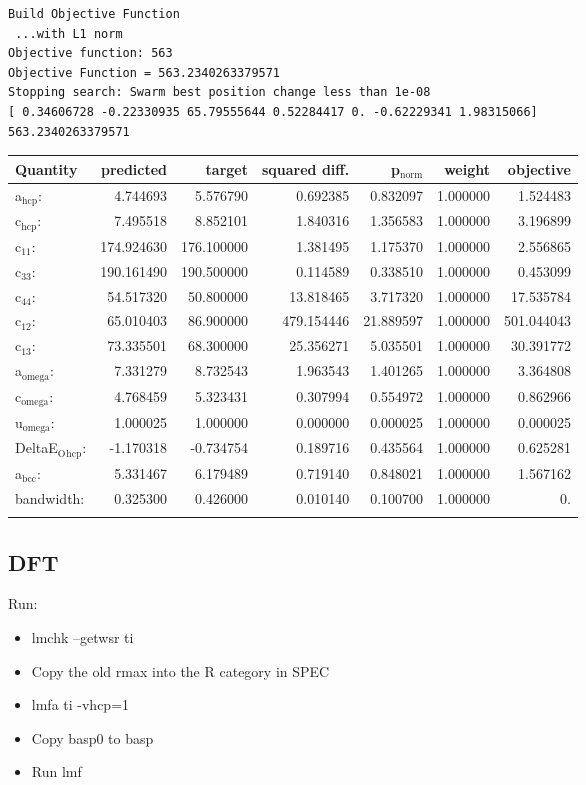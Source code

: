 \documentclass[11pt]{article}
\begin{document}
\begin{verbatim}
Build Objective Function
 ...with L1 norm 
Objective function: 563 
Objective Function = 563.2340263379571 
Stopping search: Swarm best position change less than 1e-08 
[ 0.34606728 -0.22330935 65.79555644 0.52284417 0. -0.62229341 1.98315066] 
563.2340263379571
\end{verbatim}

\begin{center}
\begin{tabular}{lrrrrrr}
Quantity & predicted & target & squared diff. & p\(_{\text{norm}}\) & weight & objective\\
\hline
a\(_{\text{hcp}}\): & 4.744693 & 5.576790 & 0.692385 & 0.832097 & 1.000000 & 1.524483\\
c\(_{\text{hcp}}\): & 7.495518 & 8.852101 & 1.840316 & 1.356583 & 1.000000 & 3.196899\\
c\(_{\text{11}}\): & 174.924630 & 176.100000 & 1.381495 & 1.175370 & 1.000000 & 2.556865\\
c\(_{\text{33}}\): & 190.161490 & 190.500000 & 0.114589 & 0.338510 & 1.000000 & 0.453099\\
c\(_{\text{44}}\): & 54.517320 & 50.800000 & 13.818465 & 3.717320 & 1.000000 & 17.535784\\
c\(_{\text{12}}\): & 65.010403 & 86.900000 & 479.154446 & 21.889597 & 1.000000 & 501.044043\\
c\(_{\text{13}}\): & 73.335501 & 68.300000 & 25.356271 & 5.035501 & 1.000000 & 30.391772\\
a\(_{\text{omega}}\): & 7.331279 & 8.732543 & 1.963543 & 1.401265 & 1.000000 & 3.364808\\
c\(_{\text{omega}}\): & 4.768459 & 5.323431 & 0.307994 & 0.554972 & 1.000000 & 0.862966\\
u\(_{\text{omega}}\): & 1.000025 & 1.000000 & 0.000000 & 0.000025 & 1.000000 & 0.000025\\
DeltaE\(_{\text{O}}\)\(_{\text{hcp}}\): & -1.170318 & -0.734754 & 0.189716 & 0.435564 & 1.000000 & 0.625281\\
a\(_{\text{bcc}}\): & 5.331467 & 6.179489 & 0.719140 & 0.848021 & 1.000000 & 1.567162\\
bandwidth: & 0.325300 & 0.426000 & 0.010140 & 0.100700 & 1.000000 & 0.\\
 &  &  &  &  &  & \\
\end{tabular}
\end{center}
\subsection{DFT}
\label{sec:org101dd9b}
Run:
\begin{itemize}
\item lmchk --getwsr ti
\item Copy the old rmax into the R category in SPEC
\item lmfa ti -vhcp=1
\item Copy basp0 to basp
\item Run lmf
\end{itemize}
\end{document}
